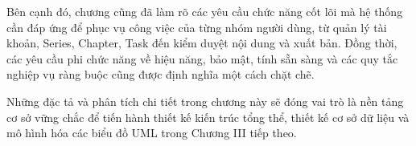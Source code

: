 Bên cạnh đó, chương cũng đã làm rõ các yêu cầu chức năng cốt lõi mà hệ thống cần đáp ứng để phục vụ công việc của từng nhóm người dùng, từ quản lý tài khoản, Series, Chapter, Task đến kiểm duyệt nội dung và xuất bản. Đồng thời, các yêu cầu phi chức năng về hiệu năng, bảo mật, tính sẵn sàng và các quy tắc nghiệp vụ ràng buộc cũng được định nghĩa một cách chặt chẽ.

Những đặc tả và phân tích chi tiết trong chương này sẽ đóng vai trò là nền tảng cơ sở vững chắc để tiến hành thiết kế kiến trúc tổng thể, thiết kế cơ sở dữ liệu và mô hình hóa các biểu đồ UML trong Chương III tiếp theo.
